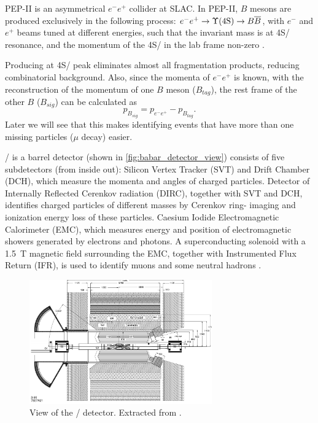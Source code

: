 PEP-II is an asymmetrical $e^- e^+$ collider at SLAC.
In PEP-II, $B$ mesons are produced exclusively in the following process:
$e^- e^+ \rightarrow \Y4S/ \rightarrow B \overline{B}$, with
$e^-$ and $e^+$ beams tuned at different energies,
such that the invariant mass is at \Y4S/ resonance,
and the momentum of the \Y4S/ in the lab frame
non-zero \cite{Harrison:1998yr}.

Producing at \Y4S/ peak eliminates almost all fragmentation products, reducing
combinatorial background.
Also, since the momenta of $e^- e^+$ is known, with the reconstruction of the
momentum of one $B$ meson ($B_{tag}$), the rest frame of the other $B$
($B_{sig}$) can be calculated as
\begin{equation}
    p_{B_{sig}} = p_{e^-e^+} - p_{B_{tag}}.
\end{equation}
Later we will see that this makes identifying events that have more than one
missing particles ($\mu$ decay) easier.

\BaBar/ is a barrel detector (shown in \autoref{fig:babar_detector_view})
consists of five subdetectors (from inside out):
Silicon Vertex Tracker (SVT) and Drift Chamber (DCH), which measure the momenta
and angles of charged particles.
Detector of Internally Reflected Cerenkov radiation (DIRC), together with SVT
and DCH, identifies charged particles of different masses by Cerenkov ring-
imaging and ionization energy loss of these particles.
Caesium Iodide Electromagnetic Calorimeter (EMC), which measures energy and
position of electromagnetic showers generated by electrons and photons.
A superconducting solenoid with a \SI{1.5}{T} magnetic field surrounding the
EMC, together with Instrumented Flux Return (IFR), is used to identify muons and
some neutral hadrons \cite{Lees:2013uzd}.

\begin{figure}[ht]
    \centering
    \includegraphics[width=0.7\textwidth]{figs/babar_detector_view.pdf}
    \caption{
        View of the \BaBar/ detector.
        Extracted from \cite{Boutigny:1995ib}.
    }
    \label{fig:babar_detector_view}
\end{figure}


